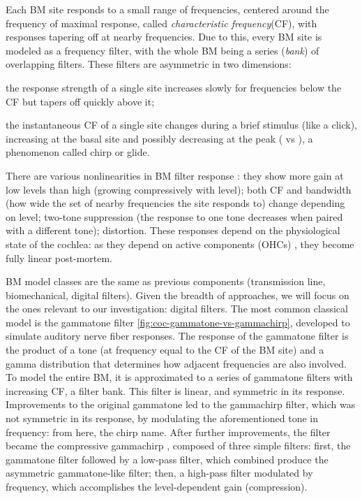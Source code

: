 \documentclass[11pt,a4paper]{article}
\begin{document}
Each BM site responds to a small range of frequencies, centered around the frequency of maximal response, called \textit{characteristic frequency}(CF), with responses tapering off at nearby frequencies. Due to this, every BM site is modeled as a frequency filter, with the whole BM being a series (\textit{bank}) of overlapping filters. These filters are asymmetric in two dimensions: 
\begin{inlinelist}
    \item the response strength of a single site increases slowly for frequencies below the CF but tapers off quickly above it;
    \item the instantaneous CF of a single site changes during a brief stimulus (like a click), increasing at the basal site and possibly decreasing at the peak (\cite{carneyFrequencyGlidesImpulse1999} vs \cite{lopez-povedaPsychophysicalEstimatesLeveldependent2007}), a phenomenon called chirp or glide.
\end{inlinelist}
There are various nonlinearities in BM filter response \cite{lopez-povedaSpectralProcessingPeripheral2005}: they show more gain at low levels than high (growing compressively with level); both CF and bandwidth (how wide the set of nearby frequencies the site responds to) change depending on level; two-tone suppression (the response to one tone decreases when paired with a different tone); distortion. These responses depend on the physiological state of the cochlea: as they depend on active components (OHCs) \cite{hopkinsChapter27Deafness2015}, they become fully linear post-mortem. 

BM model classes are the same as previous components (transmission line, biomechanical, digital filters). Given the breadth of approaches, we will focus on the ones relevant to our investigation: digital filters. The most common classical model is the gammatone filter \ref{fig:coc-gammatone-vs-gammachirp}, developed to simulate auditory nerve fiber responses. The response of the gammatone filter is the product of a tone (at frequency equal to the CF of the BM site) and a gamma distribution that determines how adjacent frequencies are also involved. To model the entire BM, it is approximated to a series of gammatone filters with increasing CF, a filter bank. This filter is linear, and symmetric in its response. Improvements to the original gammatone led to the gammachirp filter, which was not symmetric in its response, by modulating the aforementioned tone in frequency: from here, the chirp name. After further improvements, the filter became the compressive gammachirp \cite{irinoCompressiveGammachirpAuditory2001}, composed of three simple filters: first, the gammatone filter followed by a low-pass filter, which combined produce the asymmetric gammatone-like filter; then, a high-pass filter modulated by frequency, which accomplishes the level-dependent gain (compression).
\end{document}
